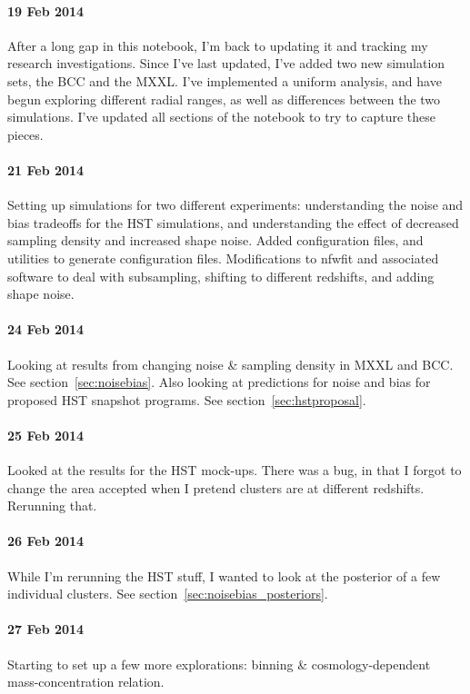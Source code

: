 \documentclass[11pt]{article}
\begin{document}
\paragraph{19 Feb 2014}
After a long gap in this notebook, I'm back to updating it and tracking my research investigations. Since I've last updated, I've added two new simulation sets, the BCC and the MXXL. I've implemented a uniform analysis, and have begun exploring different radial ranges, as well as differences between the two simulations. I've updated all sections of the notebook to try to capture these pieces.

\paragraph{21 Feb 2014}
Setting up simulations for two different experiments: understanding the noise and bias tradeoffs for the HST simulations, and understanding the effect of decreased sampling density and increased shape noise. Added configuration files, and utilities to generate configuration files. Modifications to nfwfit and associated software to deal with subsampling, shifting to different redshifts, and adding shape noise.

\paragraph{24 Feb 2014}
Looking at results from changing noise \& sampling density in MXXL and BCC. See section~\ref{sec:noisebias}.
Also looking at predictions for noise and bias for proposed HST snapshot programs. See section~\ref{sec:hstproposal}.

\paragraph{25 Feb 2014}
Looked at the results for the HST mock-ups. There was a bug, in that I forgot to change the area accepted when I pretend clusters are at different redshifts. Rerunning that.

\paragraph{26 Feb 2014}
While I'm rerunning the HST stuff, I wanted to look at the posterior of a few individual clusters. See section~\ref{sec:noisebias_posteriors}.

\paragraph{27 Feb 2014}
Starting to set up a few more explorations: binning \& cosmology-dependent mass-concentration relation.
\end{document}
